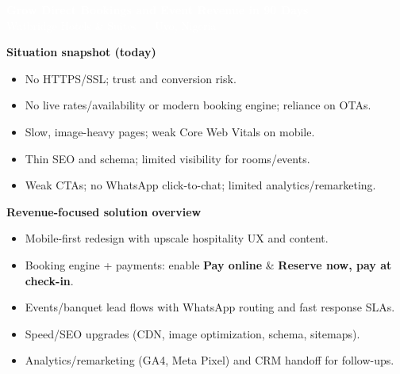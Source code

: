\documentclass[11pt,a4paper]{article}
\begin{document}
\noindent\colorbox{wbBlue}{\parbox{\dimexpr\textwidth-2\fboxsep\relax}{\vspace{10pt}
\textcolor{white}{\fontsize{18}{20}\selectfont \textbf{Grow Direct Bookings and Event Revenue in 90 Days}}\\[2pt]
\textcolor{white}{\small Watbridge Hotels \& Suites — Uyo, Nigeria}\vspace{6pt}}}

\vspace{0.8em}

\begin{minipage}[t]{0.5\textwidth}
\textbf{\color{wbBlue}Situation snapshot (today)}
\begin{itemize}
  \item No HTTPS/SSL; trust and conversion risk.
  \item No live rates/availability or modern booking engine; reliance on OTAs.
  \item Slow, image-heavy pages; weak Core Web Vitals on mobile.
  \item Thin SEO and schema; limited visibility for rooms/events.
  \item Weak CTAs; no WhatsApp click-to-chat; limited analytics/remarketing.
\end{itemize}
\end{minipage}\hfill
\begin{minipage}[t]{0.48\textwidth}
\textbf{\color{wbBlue}Revenue-focused solution overview}
\begin{itemize}
  \item Mobile-first redesign with upscale hospitality UX and content.
  \item Booking engine + payments: enable \textbf{Pay online} \& \textbf{Reserve now, pay at check-in}.
  \item Events/banquet lead flows with WhatsApp routing and fast response SLAs.
  \item Speed/SEO upgrades (CDN, image optimization, schema, sitemaps).
  \item Analytics/remarketing (GA4, Meta Pixel) and CRM handoff for follow-ups.
\end{itemize}
\end{minipage}

\vspace{0.6em}
\end{document}
